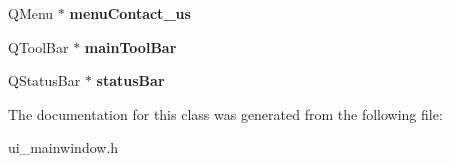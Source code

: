 \begin{DoxyCompactItemize}
\hypertarget{class_ui___main_window_a0959e3924382c51bb75157b6fc85c6e3}{}\label{class_ui___main_window_a0959e3924382c51bb75157b6fc85c6e3} 
Q\+Menu $\ast$ {\bfseries menu\+Contact\+\_\+us}
\item 
\hypertarget{class_ui___main_window_a5172877001c8c7b4e0f6de50421867d1}{}\label{class_ui___main_window_a5172877001c8c7b4e0f6de50421867d1} 
Q\+Tool\+Bar $\ast$ {\bfseries main\+Tool\+Bar}
\item 
\hypertarget{class_ui___main_window_a50fa481337604bcc8bf68de18ab16ecd}{}\label{class_ui___main_window_a50fa481337604bcc8bf68de18ab16ecd} 
Q\+Status\+Bar $\ast$ {\bfseries status\+Bar}
\end{DoxyCompactItemize}


The documentation for this class was generated from the following file\+:\begin{DoxyCompactItemize}
\item 
ui\+\_\+mainwindow.\+h\end{DoxyCompactItemize}
